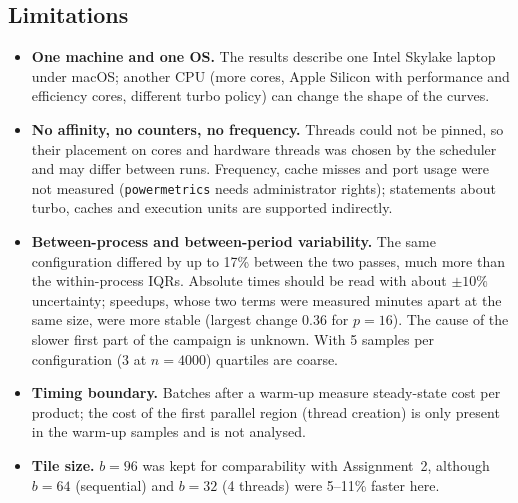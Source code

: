 \subsection{Limitations}
\begin{itemize}
\item \textbf{One machine and one OS.} The results describe one Intel Skylake laptop under macOS; another CPU (more cores, Apple Silicon with
performance and efficiency cores, different turbo policy) can change the shape of the curves.
\item \textbf{No affinity, no counters, no frequency.} Threads could not be pinned, so their placement on cores and hardware threads was chosen by the
scheduler and may differ between runs. Frequency, cache misses and port usage were not measured (\texttt{powermetrics} needs administrator rights);
statements about turbo, caches and execution units are supported indirectly.
\item \textbf{Between-process and between-period variability.} The same configuration differed by up to 17\% between the two passes, much more than the
within-process IQRs. Absolute times should be read with about $\pm10\%$ uncertainty; speedups, whose two terms were measured minutes apart at the
same size, were more stable (largest change 0.36 for $p=16$). The cause of the slower first part of the campaign is unknown. With 5 samples per
configuration (3 at $n=4000$) quartiles are coarse.
\item \textbf{Timing boundary.} Batches after a warm-up measure steady-state cost per product; the cost of the first parallel region (thread creation)
is only present in the warm-up samples and is not analysed.
\item \textbf{Tile size.} $b=96$ was kept for comparability with Assignment~2, although $b=64$ (sequential) and $b=32$ (4 threads) were 5--11\% faster here.
\end{itemize}

